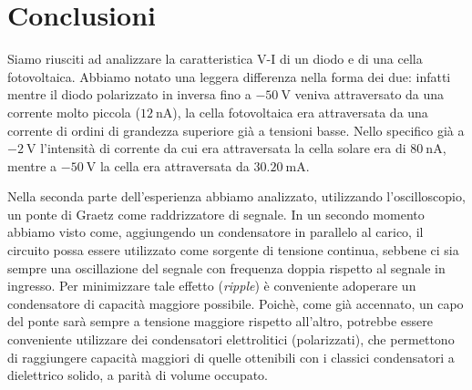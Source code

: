 \section{Conclusioni}
Siamo riusciti ad analizzare la caratteristica V-I di un diodo e di una cella fotovoltaica. Abbiamo notato una leggera differenza nella forma dei due: infatti mentre il diodo polarizzato in inversa fino a $\SI{-50}{\volt}$ veniva attraversato da una corrente molto piccola ($\SI{12}{\nano\ampere}$), la cella fotovoltaica era attraversata da una corrente di ordini di grandezza superiore già a tensioni basse. Nello specifico già a $\SI{-2}{\volt}$ l'intensità di corrente da cui era attraversata la cella solare era di $\SI{80}{\nano\ampere}$, mentre a $\SI{-50}{\volt}$ la cella era attraversata da $\SI{30.20}{\milli\ampere}$.

Nella seconda parte dell'esperienza abbiamo analizzato, utilizzando l'oscilloscopio, un ponte di Graetz come raddrizzatore di segnale. In un secondo momento abbiamo visto come, aggiungendo un condensatore in parallelo al carico, il circuito possa essere utilizzato come sorgente di tensione continua, sebbene ci sia sempre una oscillazione del segnale con frequenza doppia rispetto al segnale in ingresso. Per minimizzare tale effetto (\emph{ripple}) è conveniente adoperare un condensatore di capacità maggiore possibile.
Poichè, come già accennato, un capo del ponte sarà sempre a tensione maggiore rispetto all'altro, potrebbe essere conveniente utilizzare dei condensatori elettrolitici (polarizzati), che permettono di raggiungere capacità maggiori di quelle ottenibili con i classici condensatori a dielettrico solido, a parità di volume occupato.